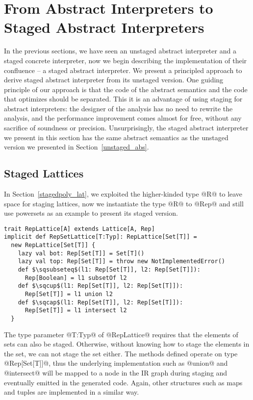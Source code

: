 \section{From Abstract Interpreters to Staged Abstract Interpreters} \label{sai}

In the previous sections, we have seen an unstaged abstract interpreter and a
staged concrete interpreter, now we begin describing the implementation of their
confluence -- a staged abstract interpreter. We present a principled approach to
derive staged abstract interpreter from its unstaged version. One guiding
principle of our approach is that the code of the abstract semantics and the
code that optimizes should be separated. This it is an advantage of using
staging for abstract interpreters: the designer of the analysis has no need to
rewrite the analysis, and the performance improvement comes almost for free,
without any sacrifice of soundness or precision. Unsurprisingly, the staged
abstract interpreter we present in this section has the same abstract semantics
as the unstaged version we presented in Section~\ref{unstaged_abs}.

\subsection{Staged Lattices}

In Section~\ref{stagedpoly_lat}, we exploited the higher-kinded type @R@ to
leave space for staging lattices, now we instantiate the type @R@ to @Rep@ and
still use powersets as an example to present its staged version.

\begin{lstlisting}
trait RepLattice[A] extends Lattice[A, Rep]
implicit def RepSetLattice[T:Typ]: RepLattice[Set[T]] = 
  new RepLattice[Set[T]] {
    lazy val bot: Rep[Set[T]] = Set[T]()
    lazy val top: Rep[Set[T]] = throw new NotImplementedError()
    def $\sqsubseteq$(l1: Rep[Set[T]], l2: Rep[Set[T]]): 
      Rep[Boolean] = l1 subsetOf l2
    def $\sqcup$(l1: Rep[Set[T]], l2: Rep[Set[T]]): 
      Rep[Set[T]] = l1 union l2
    def $\sqcap$(l1: Rep[Set[T]], l2: Rep[Set[T]]): 
      Rep[Set[T]] = l1 intersect l2
  }
\end{lstlisting}

The type parameter @T:Typ@ of @RepLattice@ requires that the elements of sets
can also be staged. Otherwise, without knowing how to stage the elements in the
set, we can not stage the set either. The methods defined operate on type
@Rep[Set[T]]@, thus the underlying implementation such as @union@ and
@intersect@ will be mapped to a node in the IR graph during staging and
eventually emitted in the generated code. Again, other structures such as maps
and tuples are implemented in a similar way.

